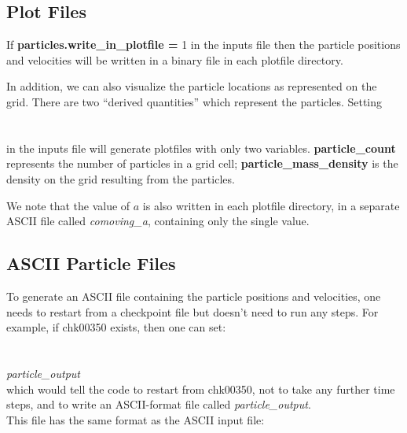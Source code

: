 \subsection{Plot Files}

If {\bf particles.write\_in\_plotfile =} 1 in the inputs file 
then the particle positions and velocities will be written in a binary file in each plotfile directory.  

In addition, we can also
visualize the particle locations as represented on the grid.  There are two ``derived quantities''
which represent the particles.  Setting \\

 \\
 \\

\noindent in the inputs file will generate plotfiles with only two variables.  
{\bf particle\_count} represents the number of particles in a grid cell; 
{\bf particle\_mass\_density} is the density on the grid resulting from the particles.

We note that the value of $a$ is also written in each plotfile directory, 
in a separate ASCII file called {\em comoving\_a}, containing only the single value. \\

\subsection{ASCII Particle Files}

To generate an ASCII file containing the particle positions and velocities, 
one needs to restart from a checkpoint
file but doesn't need to run any steps.  For example, if chk00350 exists, then one can set: \\

 \\
 \\
 {\em particle\_output} \\

\noindent which would tell the code to restart from chk00350, not to take any further time steps, and to write an ASCII-format 
file called {\em particle\_output}. \\

\noindent This file has the same format as the ASCII input file: \\

